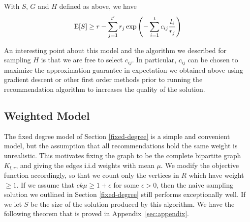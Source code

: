 \begin{thm}
With $S$, $G$ and $H$ defined as above, we have
\[ \text{E}[S] \geq r - \sum_{j=1}^{t'} r_j \exp\left(-\sum_{i=1}^t c_{ij} \frac{l_i}{r_j}\right)\]
\end{thm}
%

An interesting point about this model and the algorithm
we described for sampling $H$ is that we are free to select $c_{ij}$.
In particular, $c_{ij}$ can be chosen to maximize the
approximation guarantee in expectation we obtained above using
gradient descent or other first order methods prior to running the
recommendation algorithm to increases the quality of the solution.


\subsection{Weighted Model}
\label{weighted}
The fixed degree model of Section \ref{fixed-degree} is a simple and
convenient model, but the assumption that all recommendations hold the
same weight is unrealistic. This motivates fixing the graph to be the
complete bipartite graph $K_{l,r}$, and giving the edges i.i.d weights
with mean $\mu$. We modify the objective function accordingly, so that
we count only the vertices in $R$ which have weight $\geq 1$. If we
assume that $ck\mu \geq 1+\epsilon$ for some $\epsilon > 0$, then
the naive sampling solution we outlined in Section \ref{fixed-degree}
still performs exceptionally well. If we let $S$ be the size of the
solution produced by this algorithm. We have the following theorem that is
proved in Appendix~\ref{sec:appendix}.

